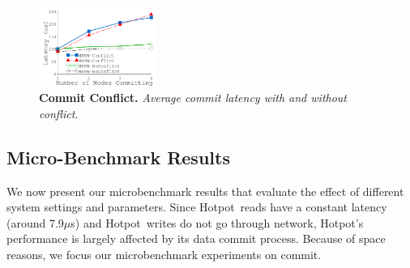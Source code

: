 \documentclass[sigconf]{acmart}
\newcommand{\us}{$\mu$s}
\renewcommand{\em}{\it}
\newcommand{\mycaption}[3]{\caption{\label{#1}{\bf #2} \em\small #3}}
\newcommand{\hotpot}{Hotpot}
\newcommand{\on}{ON}
\providecommand{\DIFdelbegin}{} %
\providecommand{\DIFdelend}{} %
\providecommand{\DIFaddbeginFL}{} %
\providecommand{\DIFaddendFL}{} %
\providecommand{\DIFdelbeginFL}{} %
\providecommand{\DIFdelendFL}{} %
\begin{document}
{{\begin{figure}[th]
\begin{minipage}{1.5in}
\begin{center}
\DIFdelbeginFL %
\DIFdelendFL \DIFaddbeginFL \vspace{-0.15in}
\DIFaddendFL \mycaption{fig-migration}{\on\ Migration.}
{
The improvement of average commit latency with \on\ migration over no migration.
}
\end{center}
\end{minipage}
\begin{minipage}{0.01in}
\hspace{0.01in}
\end{minipage}
\begin{minipage}{1.5in}
\begin{center}
\centerline{\includegraphics[width=1.5in]{Figures/g_plot_SOCC_conflict.pdf}}
\DIFdelbeginFL %
\DIFdelendFL \DIFaddbeginFL \vspace{-0.15in}
\DIFaddendFL \mycaption{fig-conflict}{Commit Conflict.}
{
Average commit latency with and without conflict.
}
\end{center}
\end{minipage}
\DIFdelbeginFL %
\DIFdelendFL \DIFaddbeginFL \vspace{-0.3in}
\DIFaddendFL \end{figure}
}

\DIFdelbegin %
\DIFdelend \subsection{Micro-Benchmark Results}
\DIFdelbegin %
\DIFdelend \label{sec:results}

We now present our microbenchmark results that evaluate the effect of different system settings and parameters.
Since \hotpot\ reads have a constant latency (around 7.9\us) and \hotpot\ writes do not go through network,
\hotpot's performance is largely affected by its data commit process.
Because of space reasons, we focus our microbenchmark experiments on commit.

}
\end{document}
